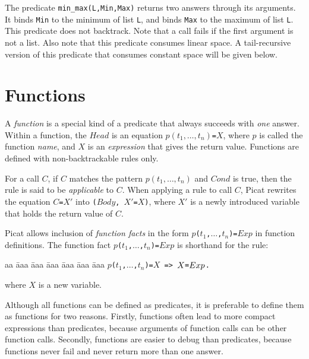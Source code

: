 The predicate \texttt{min\_max(L,Min,Max)} returns two answers through its arguments.  It binds \texttt{Min} to the minimum of list \texttt{L}, and binds \texttt{Max} to the maximum of list \texttt{L}. This predicate does not backtrack. Note that a call fails if the first argument is not a list. Also note that this predicate consumes linear space. A tail-recursive version of this predicate that consumes constant space will be given below.


\section{Functions}
A \emph{function} is a special kind of a predicate that always succeeds with \emph{one} answer. Within a function, the $Head$ is an equation $p(t_1,\ldots, t_n)$\verb+=+$X$, where $p$ is called the function \emph{name}, and $X$ is an \emph{expression} that gives the return value. Functions are defined with non-backtrackable rules only.  

For a call $C$, if $C$ matches the pattern $p(t_1,\ldots,t_n)$ and $Cond$ is true, then the rule is said to be \emph{applicable} to $C$. When applying a rule to call $C$, Picat rewrites the equation $C$\verb+=+$X'$ into \texttt{($Body$, $X'$=$X$)}, where $X'$ is a newly introduced variable that holds the return value of $C$. 

Picat allows inclusion of \emph{function facts} in the form {\tt $p$($t_1$,$\ldots$,$t_n$)\verb+=+$Exp$} in function definitions. The function fact {\tt $p$($t_1$,$\ldots$,$t_n$)\verb+=+$Exp$} is shorthand for the rule:
\begin{tabbing}
aa \= aaa \= aaa \= aaa \= aaa \= aaa \= aaa \kill
\> {\tt $p$($t_1$,$\ldots$,$t_n$)\verb+=+$X$ \verb+=>+ $X\verb+=+Exp$.}
\end{tabbing}
where $X$ is a new variable.
 
Although all functions can be defined as predicates, it is preferable to define them as functions for two reasons.  Firstly, functions often lead to more compact expressions than predicates, because arguments of function calls can be other function calls.  Secondly, functions are easier to debug than predicates, because functions never fail and never return more than one answer. 

